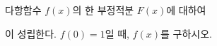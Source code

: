 다항함수 $f(x)$의 한 부정적분 $F(x)$에 대하여 \par\smallskip{}\par\smallskip\noindent 이 성립한다. $f(0)=1$일 때, $f(x)$를 구하시오.
